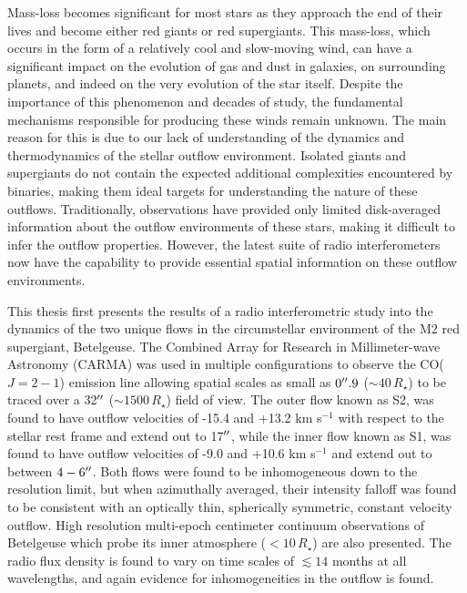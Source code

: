 
\begin{abstracts} 
\vspace{-0.5cm}
Mass-loss becomes significant for most stars as they approach the end of their lives and become either red giants or red supergiants. This mass-loss, which occurs in the form of a relatively cool and slow-moving wind, can have a significant impact on the evolution of gas and dust in galaxies, on surrounding planets, and indeed on the very evolution of the star itself.  Despite the importance of this phenomenon and decades of study,
the fundamental mechanisms responsible for producing these winds remain unknown. The main reason for this is due to our lack of understanding of the dynamics and thermodynamics of the stellar outflow environment. Isolated giants and supergiants do not contain the expected additional complexities encountered by binaries, making them ideal targets for understanding the nature of these outflows. Traditionally, observations have provided only limited disk-averaged information about the outflow environments of these stars, making it difficult to infer the outflow properties. However, the latest suite of radio interferometers now have the capability to provide essential spatial information on these outflow environments.

This thesis first presents the results of a radio interferometric study into the dynamics of the two unique flows in the circumstellar environment of the  M2 red supergiant, Betelgeuse. The  Combined Array for Research in Millimeter-wave Astronomy (CARMA) was used in multiple configurations to observe the CO($J=2-1$) emission line allowing  spatial scales as small as $0^{\prime\prime} .9$ ($\sim 40\,R_{\star}$) to be traced over a 32$^{\prime\prime}$ ($\sim 1500\,R_{\star}$) field of view. The outer flow known as S2, was found to have outflow velocities of -15.4 and +13.2 km s$^{-1}$ with respect to the stellar rest frame and extend out to 17$^{\prime\prime}$, while the inner flow known as S1, was found to have outflow velocities of -9.0 and +10.6 km s$^{-1}$ and extend out to between $4 - 6^{\prime\prime}$. Both flows were found to be inhomogeneous down to the resolution limit, but when azimuthally averaged, their intensity falloff was found to be consistent with an optically thin, spherically symmetric, constant velocity outflow. High resolution multi-epoch centimeter continuum observations of Betelgeuse which probe its inner atmosphere ($< 10\,R_{\star}$) are also presented. The radio flux density is found to vary on time scales of $\lesssim 14$ months at all wavelengths, and again evidence for inhomogeneities in the outflow is found.


\end{abstracts}
